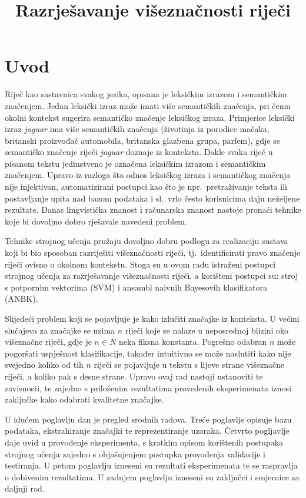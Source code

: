 \documentclass[10pt, a4paper]{article}
\title{Razrješavanje višeznačnosti riječi}
\begin{document}
\maketitleabstract

\section{Uvod}

Riječ kao sastavnica svakog jezika, opisana je leksičkim izrazom i semantičkim značenjem.
Jedan leksički izraz može imati više semantičkih značenja, pri čemu okolni kontekst
sugerira semantičko značenje leksičkog izraza. 
Primjerice leksički izraz \emph{jaguar} ima više semantičkih značenja
(životinja iz porodice mačaka, britanski proizvođač automobila, 
britanska glazbena grupa, parfem), gdje se semantičko značenje riječi \emph{jaguar}
doznaje iz konteksta. Dakle svaka riječ u pisanom tekstu jedinstveno je označena 
leksičkim izrazom i semantičkim značenjem. Upravo iz razloga što odnos 
leksičkog izraza i semantičkog značenja nije injektivan, 
automatizirani postupci kao što je npr.~pretraživanje teksta ili
postavljanje upita nad bazom podataka i sl.~vrlo često korisnicima 
daju neželjene rezultate. Danas lingvistička znanost i računarska znanost 
nastoje pronaći tehnike koje bi dovoljno dobro 
rješavale navedeni problem.

Tehnike strojnog učenja pružaju dovoljno dobru podlogu za realizaciju sustava
koji bi bio sposoban razriješiti višeznačnosti riječi, tj.~identificirati pravo
značenje riječi ovisno o okolnom kontekstu. Stoga su u ovom radu istraženi postupci
strojnog učenja za razrješavanje višeznačnosti riječi, a korišteni postupci su:
stroj s potpornim vektorima (SVM) i ansambl naivnih Bayesovih klasifikatora (ANBK).

Slijedeći problem koji se pojavljuje je kako izlučiti značajke iz konteksta.
U većini slučajeva za značajke se uzima $n$ riječi koje se nalaze u neposrednoj blizini oko višeznačne riječi, gdje je $n \in N$ neka fiksna konstanta. Pogrešno odabran $n$ može pogoršati uspješnost klasifikacije, također intuitivno se može naslutiti kako nije svejedno koliko od tih $n$ riječi se pojavljuje u tekstu s lijeve strane višeznačne riječi, a koliko pak s desne strane.
Upravo ovaj rad nastoji ustanoviti te zavisnosti, te zajedno s priloženim rezultatima provedenih eksperimenata iznosi zaključke kako odabrati kvalitetne značajke.

U idućem poglavlju dan je pregled srodnih radova. Treće poglavlje opisuje bazu
podataka, ekstrahiranje značajki te reprezentiranje uzoraka. Četvrto pogljavlje
daje uvid u provođenje eksperimenta, s kratkim opisom korištenih postupaka
strojnog učenja zajedno s objašnjenjem postupka provođenja validacije i testiranja. U petom
poglavlju izneseni su rezultati eksperimenata te se raspravlja o dobivenim rezultatima.
U zadnjem poglavlju izneseni su zaključci i smjernice za daljnji rad.
\end{document}
